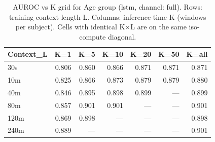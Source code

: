 \begin{table}[ht]
\centering
\caption{AUROC vs K grid for Age group (lstm, channel: full). Rows: training context length L. Columns: inference-time K (windows per subject). Cells with identical K×L are on the same iso-compute diagonal.}
\label{tab:kgrid_age_class_lstm_full}
\begin{tabular}{lrrrrrr}
\toprule
Context_L & K=1 & K=5 & K=10 & K=20 & K=50 & K=all \\
\midrule
30s & 0.806 & 0.860 & 0.866 & 0.871 & 0.871 & 0.871 \\
10m & 0.825 & 0.866 & 0.873 & 0.879 & 0.879 & 0.880 \\
40m & 0.846 & 0.895 & 0.898 & 0.899 & — & 0.899 \\
80m & 0.857 & 0.901 & 0.901 & — & — & 0.901 \\
120m & 0.869 & 0.898 & — & — & — & 0.898 \\
240m & 0.889 & — & — & — & — & 0.901 \\
\bottomrule
\end{tabular}
\end{table}
